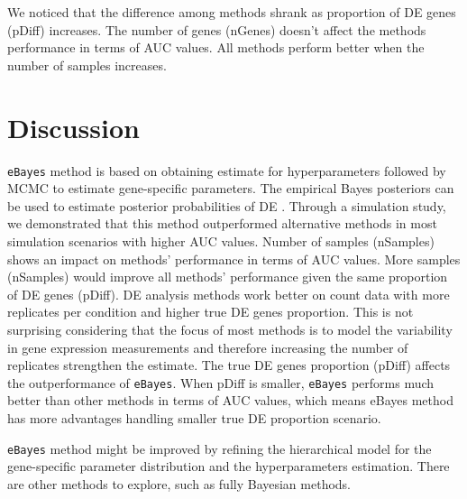 We noticed that the difference among methods shrank as proportion of DE genes (pDiff) increases. The number of genes (nGenes) doesn't affect the methods performance in terms of AUC values. All methods perform better when the number of samples increases.


\section{Discussion}

\texttt{eBayes} method is based on obtaining estimate for hyperparameters followed by MCMC to estimate gene-specific parameters. The empirical Bayes posteriors can be used to estimate posterior probabilities of DE . Through a simulation study, we demonstrated that this method outperformed alternative methods in most simulation scenarios with higher AUC values. Number of samples (nSamples) shows an impact on methods' performance in terms of AUC values. More samples (nSamples) would improve all methods' performance given the same proportion of DE genes (pDiff). DE analysis methods work better on count data with more replicates per condition and higher true DE genes proportion. This is not surprising considering that the focus of most methods is to model the variability in gene expression measurements and therefore increasing the number of replicates strengthen the estimate. The true DE genes proportion (pDiff) affects the outperformance of \texttt{eBayes}. When pDiff is smaller, \texttt{eBayes} performs much better than other methods in terms of AUC values, which means eBayes method has more advantages handling smaller true DE proportion scenario.



\texttt{eBayes} method might be improved by refining the hierarchical model for the gene-specific parameter distribution and the hyperparameters estimation. There are other methods to explore, such as fully Bayesian methods. 




